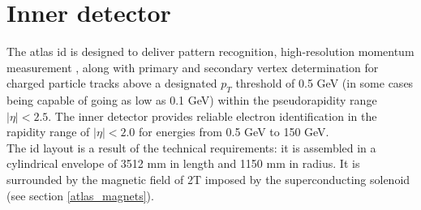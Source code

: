        \section{Inner detector}
		The \gls{atlas} \gls{id} is designed to deliver pattern recognition, high-resolution momentum measurement \cite{id_tdr1},\cite{id_tdr2} along with primary and secondary vertex determination for charged particle tracks above a designated $p_T$ threshold of 0.5 GeV (in some cases being capable of going as low as 0.1 GeV) within the pseudorapidity range $|\eta| < 2.5$. The inner detector provides reliable electron identification in the rapidity range of $|\eta| < 2.0$ for energies from 0.5 GeV to 150 GeV.\\
		The  \gls{id} layout is a result of the technical requirements: it is assembled in a cylindrical envelope of 3512 mm in length and 1150 mm in radius. It is surrounded by the magnetic field of 2T imposed by the superconducting solenoid (see section \ref{atlas_magnets}).
		
